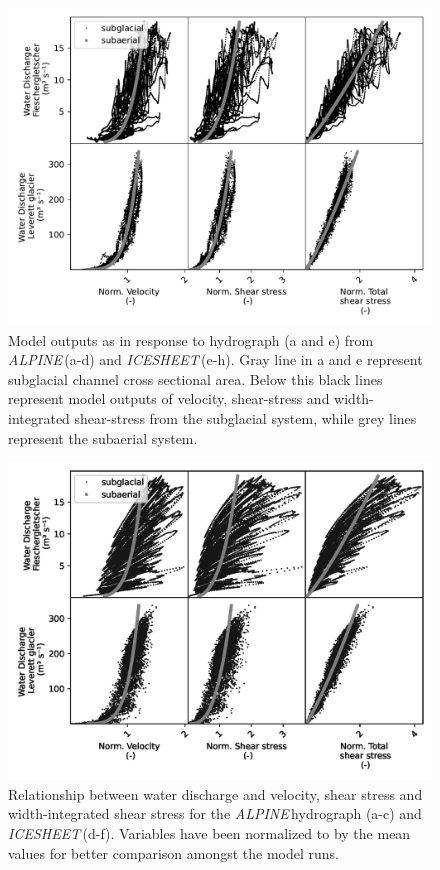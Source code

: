 \documentclass[draft]{agujournal2019}
\newcommand{\alpine}{\textit{ALPINE}\,}
\newcommand{\icesheet}{\textit{ICESHEET}\,}
\begin{document}
\begin{center}
  \begin{figure}[H]
    \includegraphics[width=0.8\linewidth]{model_outputs.pdf}
    \caption{Model outputs as in response to hydrograph (a and e) from \alpine (a-d) and \icesheet (e-h). Gray line in a and e represent subglacial channel cross sectional area. Below this black lines represent model outputs of velocity, shear-stress and width-integrated shear-stress from the subglacial system, while grey lines represent the subaerial system. } 
    \label{fig:model_outs}
  \end{figure}
\end{center}


\begin{center}
  \begin{figure}[H]
    \includegraphics[width=0.8\linewidth]{Qw_vari.png}
    \caption{Relationship between water discharge and velocity, shear stress and width-integrated shear stress for the \alpine hydrograph (a-c) and \icesheet (d-f). Variables have been normalized to by the mean values for better comparison amongst the model runs.} 
    \label{fig:Qw_vari}
  \end{figure}
\end{center}
\end{document}
